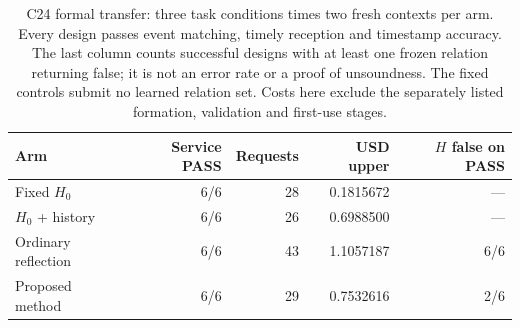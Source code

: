 \begin{table}[htbp]
\centering\small
\begin{tabular}{@{}lrrrr@{}}
\toprule
Arm & Service PASS & Requests & USD upper & $H$ false on PASS \\
\midrule
Fixed $H_0$ & 6/6 & 28 & 0.1815672 & --- \\
$H_0$ + history & 6/6 & 26 & 0.6988500 & --- \\
Ordinary reflection & 6/6 & 43 & 1.1057187 & 6/6 \\
Proposed method & 6/6 & 29 & 0.7532616 & 2/6 \\
\bottomrule
\end{tabular}
\caption{C24 formal transfer: three task conditions times two fresh contexts per arm. Every design passes event matching, timely reception and timestamp accuracy. The last column counts successful designs with at least one frozen relation returning false; it is not an error rate or a proof of unsoundness. The fixed controls submit no learned relation set. Costs here exclude the separately listed formation, validation and first-use stages.}\label{tab:cformal}
\end{table}
